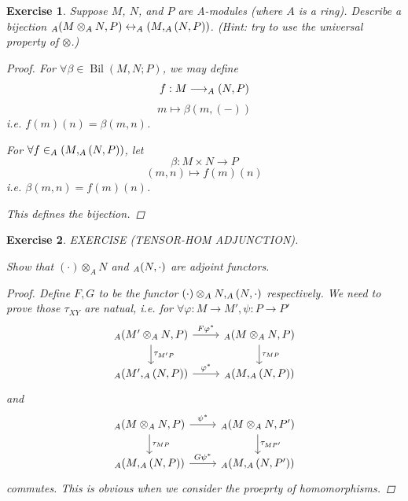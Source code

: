 \documentclass{article}
\theoremstyle{breakstyle}
\newtheorem{exercise}{Exercise}[section]
\let\hom\relax
\DeclareMathOperator{\hom}{Hom}
\DeclareMathOperator{\bil}{Bil}
\begin{document}
\begin{exercise}
Suppose $M$, $N$, and $P$ are A-modules (where $A$ is a ring). Describe a
bijection $\hom_{A}(M \otimes_{A} N, P) \leftrightarrow \hom_{A}(M,
\hom_{A}(N, P))$. (Hint: try to use the universal property of $\otimes$.)

\begin{proof}
    For $\forall \beta\in \bil{\left( M,N;P \right) }$, we may define
    $$
    f:M\longrightarrow \hom_{A}{\left( N,P \right)}
    $$
    $$
    m\longmapsto \beta\left( m,\left( - \right)  \right) 
    $$
    i.e. $f\left( m \right) \left( n \right) =\beta\left( m,n \right) $.

    For $\forall f\in \hom_{A}\left( M,\hom_{A}\left( N,P \right)  \right) $,
    let
    $$
    \beta:M\times N\longrightarrow P
    $$
    $$
    \left( m,n \right) \longmapsto f\left( m \right) \left( n \right)
    $$
    i.e. $\beta\left( m,n \right) =f\left( m \right) \left( n \right)$.

    This defines the bijection.
\end{proof}

\end{exercise}

\begin{exercise}
EXERCISE (TENSOR-HOM ADJUNCTION).

Show that $(\cdot)\otimes_{A}N$ and $\hom_{A}(N,\cdot)$ are adjoint
functors.

\begin{proof}
    Define $F,G$ to be the functor $(\cdot)\otimes _{A}N,\hom_{A}(N,\cdot)$
    respectively. We need to prove those $\tau_{XY}$ are natual, i.e. for
    $\forall \varphi:M\longrightarrow M',\psi:P\longrightarrow P'$
    $$
    \begin{tikzcd}
        {\hom_{A}{(M'\otimes_{A}N,P)}} \arrow[r, "F\varphi^{*}"] \arrow[d, "\tau_{M'P}"] & {\hom_{A}{(M\otimes_{A}N,P)}} \arrow[d, "\tau_{MP}"] \\
        {\hom_{A}{(M',\hom_{A}{(N,P)})}} \arrow[r, "\varphi^{*}"]                        & {\hom_{A}{(M,\hom_{A}{(N,P)})}}                    
    \end{tikzcd}
    $$
    and
    $$
    \begin{tikzcd}
        {\hom_{A}{(M\otimes_{A}N,P)}} \arrow[r, "\psi^{*}"] \arrow[d, "\tau_{MP}"] & {\hom_{A}{(M\otimes_{A}N,P')}} \arrow[d, "\tau_{MP'}"] \\
        {\hom_{A}{(M,\hom_{A}{(N,P)})}} \arrow[r, "G\psi^{*}"]                     & {\hom_{A}{(M,\hom_{A}{(N,P')})}}                     
    \end{tikzcd}
    $$
    commutes.
    This is obvious when we consider the proeprty of homomorphisms.
\end{proof}

\end{exercise}
\end{document}
